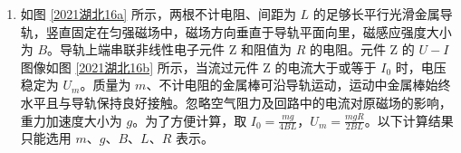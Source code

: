 \documentclass[\gkver]{gaokaozhenti}
\begin{document}
\begin{enumerate}
{\begin{enumerate}
	$x=v_{2}t$

	联立解得

	$x=2R$

	\item
	对 A 由 C 到 D 的过程，由机械能守恒定律得

	$mgR\cos\theta=\frac{1}{2}mv_{D}^{2}$

	由于对 A 做功的力只有重力，则 A 所受力对 A 做功的功率为

	$P=mgv_{D}\sin\theta$

	解得

	$P=mg\sin\theta\sqrt{2gR\cos\theta}$

	\item
	设 A、B 碰后瞬间的速度分别为 $v_{1}$、$v_{2}$，对 B 由 Q 到最高点的过程，由机械能守恒定律得

	$\frac{1}{2}mv_{2}^{2}=\frac{1}{2}mv_{2}'^{2}+mg\cdot 2R$

	解得

	$v_{2}=\sqrt{5gR}$

	对 A 由 Q 到 C 的过程，由机械能守恒定律得

	$\frac{1}{2}mv_{1}^{2}=mgR$

	解得

	$v_{1}=\sqrt{2gR}$

	设碰前瞬间 A 的速度为 $v_{0}$，对 A、B 碰撞的过程，由动量守恒定律得

	$mv_{0}=mv_{1}+mv_{2}$

	解得

	$v_{0}=\sqrt{2gR}+\sqrt{5gR}$

	碰撞过程中 A 和 B 损失的总动能为

	$\Delta E=\frac{1}{2}mv_{0}^{2}-\frac{1}{2}mv_{1}^{2}-\frac{1}{2}mv_{2}^{2}$

	解得

	$\Delta E=\sqrt{10}mgR$
\end{enumerate}
}

\item
如图 \ref{2021湖北16a} 所示，两根不计电阻、间距为 $L$ 的足够长平行光滑金属导轨，竖直固定在匀强磁场中，磁场方向垂直于导轨平面向里，磁感应强度大小为 $B$。导轨上端串联非线性电子元件 Z 和阻值为 $R$ 的电阻。元件 Z 的 $U-I$ 图像如图 \ref{2021湖北16b} 所示，当流过元件 Z 的电流大于或等于 $I_{0}$ 时，电压稳定为 $U_{m}$。质量为 $m$、不计电阻的金属棒可沿导轨运动，运动中金属棒始终水平且与导轨保持良好接触。忽略空气阻力及回路中的电流对原磁场的影响，重力加速度大小为 $g$。为了方便计算，取 $I_{0}=\frac{mg}{4BL}$，$U_{m}=\frac{mgR}{2BL}$。以下计算结果只能选用 $m$、$g$、$B$、$L$、$R$ 表示。


\end{enumerate}
\end{document}
